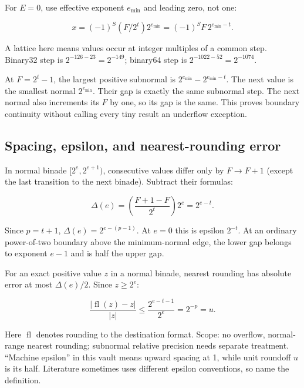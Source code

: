 \hypertarget{03-visual-computing-i-ch018-subnormal-lattice-and-boundary-continuity}{}

For \(E=0\), use effective exponent \(e_{\min}\) and leading zero, not one:

\[
x=(-1)^S(F/2^t)2^{e_{\min}}=(-1)^S F\,2^{e_{\min}-t}.
\]

A lattice here means values occur at integer multiples of a common step. Binary32 step is \(2^{-126-23}=2^{-149}\); binary64 step is \(2^{-1022-52}=2^{-1074}\).

At \(F=2^t-1\), the largest positive subnormal is \(2^{e_{\min}}-2^{e_{\min}-t}\). The next value is the smallest normal \(2^{e_{\min}}\). Their gap is exactly the same subnormal step. The next normal also increments its \(F\) by one, so its gap is the same. This proves boundary continuity without calling every tiny result an underflow exception.

\subsection{Spacing, epsilon, and nearest-rounding error}\label{03-visual-computing-i-ch018-spacing-epsilon-and-nearest-rounding-error}

\hypertarget{03-visual-computing-i-ch018-spacing-epsilon-and-nearest-rounding-error}{}

In normal binade \([2^e,2^{e+1})\), consecutive values differ only by \(F\to F+1\) (except the last transition to the next binade). Subtract their formulas:

\[
\Delta(e)=\left(\frac{F+1-F}{2^t}\right)2^e=2^{e-t}.
\]

Since \(p=t+1\), \(\Delta(e)=2^{e-(p-1)}\). At \(e=0\) this is epsilon \(2^{-t}\). At an ordinary power-of-two boundary above the minimum-normal edge, the lower gap belongs to exponent \(e-1\) and is half the upper gap.

For an exact positive value \(z\) in a normal binade, nearest rounding has absolute error at most \(\Delta(e)/2\). Since \(z\ge2^e\):

\[
\frac{|\operatorname{fl}(z)-z|}{|z|}
\le\frac{2^{e-t-1}}{2^e}=2^{-p}=u.
\]

Here \(\operatorname{fl}\) denotes rounding to the destination format. Scope: no overflow, normal-range nearest rounding; subnormal relative precision needs separate treatment. ``Machine epsilon'' in this vault means upward spacing at 1, while unit roundoff \(u\) is its half. Literature sometimes uses different epsilon conventions, so name the definition.

